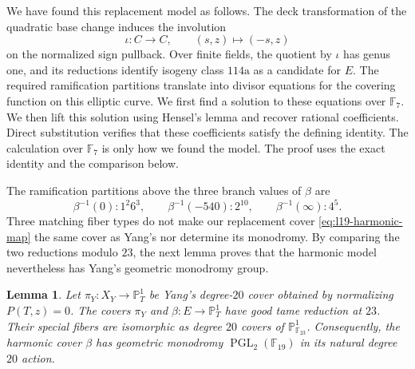 \documentclass[10pt]{amsart}
\numberwithin{equation}{section}
\newtheorem{lemma}[theorem]{Lemma}
\theoremstyle{definition}
\theoremstyle{remark}
\newcommand{\PP}{\mathbb P}
\newcommand{\F}{\mathbb{F}}
\newcommand{\PGL}{\operatorname{PGL}}
\begin{document}
We have found this replacement model as follows. The deck transformation of the
quadratic base change induces the involution
\[
 \iota\colon C\longrightarrow C,\qquad (s,z)\longmapsto(-s,z)
\]
on the normalized sign pullback.  Over finite fields, the quotient by
$\iota$ has genus one, and its reductions identify isogeny class $114\mathrm a$
as a candidate for $E$.  The required ramification partitions translate into
divisor equations for the covering function on this elliptic curve. We first find a solution to these equations over $\F_7$. We then lift this solution using Hensel's lemma and recover rational coefficients.  Direct substitution verifies that these coefficients satisfy the defining identity. The calculation over $\F_7$ is only how we found the
  model.  The proof uses the exact identity and the comparison below.

The ramification partitions above the three branch values of $\beta$ are
\[
 \beta^{-1}(0):1^2 6^3,
 \qquad
 \beta^{-1}(-540):2^{10},
 \qquad
 \beta^{-1}(\infty):4^5 .
\]
Three matching fiber types do not make our replacement cover \eqref{eq:l19-harmonic-map} the same
cover as Yang's nor determine its monodromy. By comparing the two
reductions modulo $23$, the next lemma proves that the harmonic model
nevertheless has Yang's geometric monodromy group.

\begin{lemma}\label{lem:l19-harmonic-is-yang}
Let $\pi_Y\colon X_Y\to\PP^1_T$ be Yang's degree-$20$ cover obtained by
normalizing $P(T,z)=0$.  The covers $\pi_Y$ and
$\beta\colon E\to\PP^1_T$ have good tame reduction at $23$. Their
special fibers are isomorphic as degree $20$ covers of
$\PP^1_{\F_{23}}$.  Consequently, the harmonic cover $\beta$ has geometric
monodromy $\PGL_2(\F_{19})$ in its natural degree $20$ action.
\end{lemma}
\end{document}
